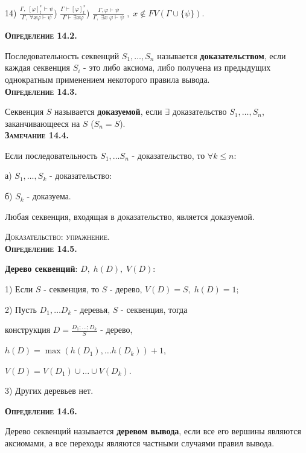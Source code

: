 \documentclass[18pt, a4paper]{extarticle}
\newcommand{\Gm}{\Gamma}
\begin{document}
14) $\displaystyle \frac{\Gm,\;[\varphi]^x_t\vdash\psi}{\Gm,\;\forall x\varphi\vdash\psi}$\qquad\;) $\displaystyle \frac{\Gm\vdash[\varphi]^x_t}{\Gm\vdash\exists x\varphi}$\qquad\;) $\displaystyle \frac{\Gm,\varphi\vdash\psi}{\Gm,\;\exists x\;\varphi\vdash\psi}\;,\;x\notin FV(\Gm\cup\{\psi\})$.\\

\newpage

\textbf{\textsc{Определение 14.2.}} 

Последовательность секвенций $S_1,\ldots,S_n$ называется \textbf{доказательством}, если каждая секвенция $S_i$ -  это либо аксиома, либо получена из предыдущих однократным применением некоторого правила вывода.\\

\textbf{\textsc{Определение 14.3.}} 

Секвенция $S$ называется \textbf{доказуемой}, если $\exists$ доказательство $S_1,\ldots,S_n$, заканчивающееся на $S$ ($S_n = S$).\\

\textbf{\textsc{Замечание 14.4.}} 

Если последовательность $S_1,\ldots S_n$ -  доказательство, то $\forall k\leqslant n:$ 

а) $S_1,\ldots,S_k$ -  доказательство:

б) $S_k$ -  доказуема.

Любая секвенция, входящая в доказательство, является доказуемой.

\textsc{Доказательство: упражнение.}\\

\textbf{\textsc{Определение 14.5.}}

\textbf{Дерево секвенций}: $D,\;h(D),\;V(D):$

1) Если $S$ -  секвенция, то $S$ -  дерево, $V(D)=S,\;h(D)=1;$

2) Пусть $D_1,\ldots D_k$ -  деревья, $S$ -  секвенция, тогда 

конструкция $\displaystyle D=\frac{D_1;\ldots;D_k}{S}$ -  дерево, 

\qquad$h(D) = \max (h(D_1),\ldots h(D_k)) + 1$,

\qquad$V(D)=V(D_1)\cup\dots\cup V(D_k)$.

3) Других деревьев нет.\\

\newpage

\textbf{\textsc{Определение 14.6.}} 

Дерево секвенций называется \textbf{деревом вывода}, если все его вершины являются аксиомами, а все переходы являются частными случаями правил вывода.\\
\end{document}
